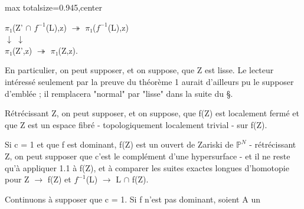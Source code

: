 \documentclass[10pt,a4paper]{article}
\begin{document}
\begin{adjustbox}{max totalsize={\textwidth}{0.945\textheight},center}
\begin{minipage}{\textwidth}
\noindent \ensuremath{π₁}(Z' \ensuremath{∩} \ensuremath{f^{-1}}(L),z)  \ensuremath{↠}  \ensuremath{π₁}(\ensuremath{f^{-1}}(L),z)\\          \ensuremath{↓}                         \ensuremath{↓}\\\ensuremath{π₁}(Z',z)              \ensuremath{↠}  \ensuremath{π₁}(Z,z).\par\smallskip
\noindent En particulier, on peut supposer, et on suppose, que Z est lisse. Le lecteur intéressé seulement par la preuve du théorème 1 aurait d'ailleurs pu le supposer d'emblée ; il remplacera "normal" par "lisse" dans la suite du §.\par\smallskip
\noindent Rétrécissant Z, on peut supposer, et on suppose, que f(Z) est localement fermé et que Z est un espace fibré - topologiquement localement trivial - sur f(Z).\par\smallskip
\noindent Si c = 1 et que f est dominant, f(Z) est un ouvert de Zariski de \ensuremath{ℙ^N} - rétrécissant Z, on peut supposer que c'est le complément d'une hypersurface - et il ne reste qu'à appliquer 1.1 à f(Z), et à comparer les suites exactes longues d'homotopie pour Z \ensuremath{→} f(Z) et \ensuremath{f^{-1}}(L) \ensuremath{→} L \ensuremath{∩} f(Z).\par\smallskip
\noindent Continuons à supposer que c = 1. Si f n'est pas dominant, soient A un\par\smallskip
\end{minipage}
\end{adjustbox}
\newpage
\end{document}
